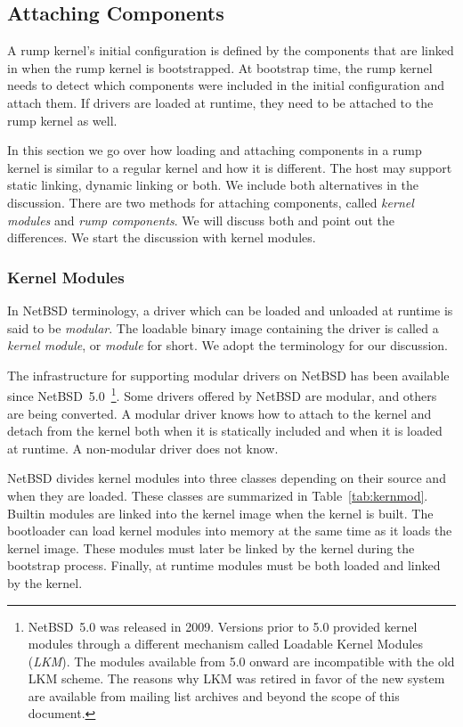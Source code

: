 \subsection{Attaching Components}

A rump kernel's initial configuration is defined by the components that
are linked in when the rump kernel is bootstrapped.  At bootstrap time,
the rump kernel needs to detect which components were included in the
initial configuration and attach them.  If drivers are loaded at runtime,
they need to be attached to the rump kernel as well.

In this section we go over how loading and attaching components in
a rump kernel is similar to a regular kernel and how it is different.
The host may support static linking, dynamic linking or both.  We include
both alternatives in the discussion.  There are two methods for attaching
components, called \textit{kernel modules} and \textit{rump components}.
We will discuss both and point out the differences.  We start the
discussion with kernel modules.

\subsubsection{Kernel Modules}
\label{sect:extending}

In NetBSD terminology, a driver which can be loaded and unloaded
at runtime is said to be \textit{modular}.  The loadable binary
image containing the driver is called a \textit{kernel module}, or
\textit{module} for short.  We adopt the terminology for our
discussion.

The infrastructure for supporting modular drivers on NetBSD has
been available since NetBSD~5.0~\footnote
{
	NetBSD~5.0 was released in 2009.  Versions prior to 5.0
	provided kernel modules through a different mechanism called
	Loadable Kernel Modules (\textit{LKM}).  The modules
	available from 5.0 onward are incompatible with the old
	LKM scheme.  The reasons why LKM was retired in favor of
	the new system are available from mailing list archives
	and beyond the scope of this document.
}.
Some drivers offered by NetBSD are modular, and others are being
converted.  A modular driver knows how to attach to the kernel and detach
from the kernel both when it is statically included and when it is loaded
at runtime.  A non-modular driver does not know.

NetBSD divides kernel modules into three classes depending on their
source and when they are loaded.  These classes are summarized in
Table~\ref{tab:kernmod}.  Builtin modules are linked into the kernel
image when the kernel is built.  The bootloader can load kernel modules
into memory at the same time as it loads the kernel image.  These modules
must later be linked by the kernel during the bootstrap process.  Finally,
at runtime modules must be both loaded and linked by the kernel.

